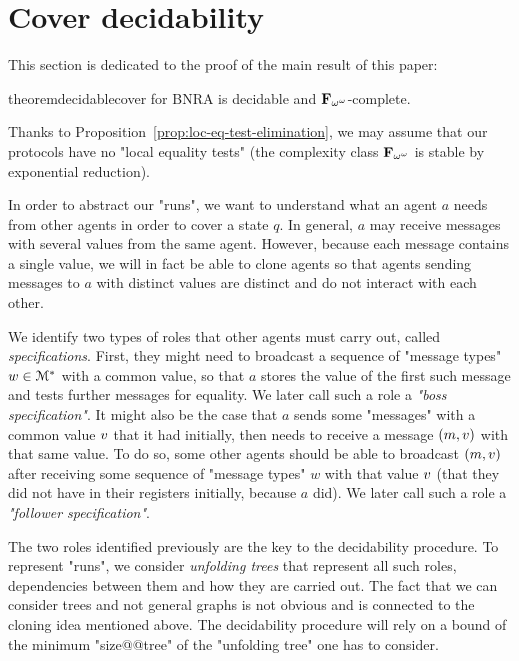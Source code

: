 \section{Cover decidability}
\label{sec:cover-decidability}

This section is dedicated to the proof of the main result of this paper:

\begin{restatable}{theorem}{decidablecover}
\label{thm:decidable-cover}
\COVER for BNRA is decidable and $\mathbf{F}_{\omega^\omega}$-complete.
\end{restatable}

Thanks to Proposition~\ref{prop:loc-eq-test-elimination}, we may assume that our protocols have no "local equality tests" (the complexity class $\mathbf{F}_{\omega^{\omega}}$ is stable by exponential reduction).

In order to abstract our "runs", we want to understand what an agent $a$ needs from other agents in order to cover a state $q$. 
In general, $a$ may receive messages with several values from the same agent. However, because each message contains a single value, we will in fact be able to clone agents so that agents sending messages to $a$ with distinct values are distinct and do not interact with each other. 

We identify two types of roles that other agents must carry out, called \emph{specifications}. First, they might need to broadcast a sequence of "message types" $w \in \mathcal{M}^*$ with a common value, so that $a$ stores the value of the first such message and tests further messages for equality. We later call such a role a \emph{"boss specification"}.  
It might also be the case that $a$ sends some "messages" with a common value $v$ that it had initially, then needs to receive a message $(m, v)$ with that same value. To do so, some other agents should be able to  broadcast $(m, v)$ after receiving some sequence of "message types" $w$ with that value $v$ (that they did not have in their registers initially, because $a$ did). We later call such a role a \emph{"follower specification"}.

The two roles identified previously are the key to the decidability procedure.
To represent "runs", we consider \emph{unfolding trees} that represent all such roles, dependencies between them and how they are carried out. The fact that we can consider trees and not general graphs is not obvious and is connected to the cloning idea mentioned above.  The decidability procedure will rely on a bound of the minimum "size@@tree" of the "unfolding tree" one has to consider.

